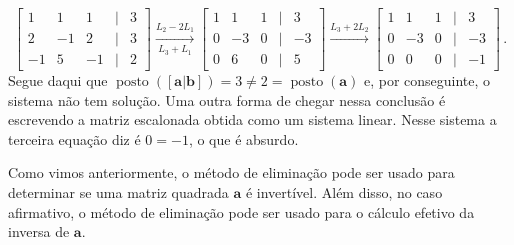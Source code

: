 \documentclass[12pt,a4paper]{report}
\newcommand{\mb}{\mathbf}
\DeclareMathOperator{\posto}{posto}
\begin{document}
\begin{enumerate}
$$\begin{bmatrix}
    1&1&1&|&3\\
    2&-1&2&|&3\\
    -1&5&-1&|&2
  \end{bmatrix}\xrightarrow[L_3+L_1]{L_2-2L_1} \begin{bmatrix}
    1&1&1&|&3\\
    0&-3&0&|&-3\\
    0&6&0&|&5
  \end{bmatrix}\xrightarrow{L_3+2L_2} \begin{bmatrix}
    1&1&1&|&3\\
    0&-3&0&|&-3\\
    0&0&0&|&-1
  \end{bmatrix}\,.$$
  Segue daqui que $\posto([\mb a|\mb b])=3\ne 2=\posto(\mb a)$ e, por conseguinte, o sistema não tem solução. Uma outra forma de chegar nessa conclusão é escrevendo a matriz escalonada obtida como um sistema linear. Nesse sistema a terceira equação diz é $0=-1$, o que é absurdo.
\end{enumerate}

Como vimos anteriormente, o método de eliminação pode ser usado para determinar se uma matriz quadrada $\mb a$ é invertível. Além disso, no caso afirmativo, o método de eliminação pode ser usado para o cálculo efetivo da inversa de $\mb a$.
\end{document}
